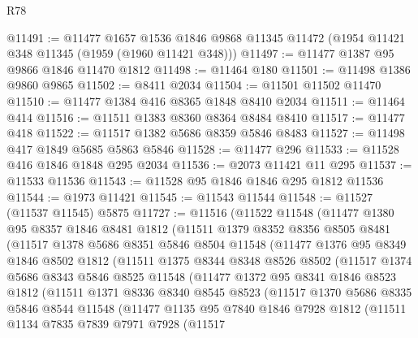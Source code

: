 \begin{lexlean}{R78}
\begin{coremodule}
@11491 := @11477
    @1657
    @1536
    @1846
    @9868
    @11345
    @11472
    (@1954 @11421 @348 @11345 (@1959 (@1960 @11421 @348)))
@11497 := @11477 @1387 @95 @9866 @1846 @11470 @1812
@11498 := @11464 @180
@11501 := @11498 @1386 @9860 @9865
@11502 := @8411 @2034
@11504 := @11501 @11502 @11470
@11510 := @11477 @1384 @416 @8365 @1848 @8410 @2034
@11511 := @11464 @414
@11516 := @11511 @1383 @8360 @8364 @8484 @8410
@11517 := @11477 @418
@11522 := @11517 @1382 @5686 @8359 @5846 @8483
@11527 := @11498 @417 @1849 @5685 @5863 @5846
@11528 := @11477 @296
@11533 := @11528 @416 @1846 @1848 @295 @2034
@11536 := @2073 @11421 @11 @295
@11537 := @11533 @11536
@11543 := @11528 @95 @1846 @1846 @295 @1812 @11536
@11544 := @1973 @11421
@11545 := @11543 @11544
@11548 := @11527 (@11537 @11545) @5875
@11727 := @11516
    (@11522
      @11548
      (@11477
        @1380
        @95
        @8357
        @1846
        @8481
        @1812
        (@11511
          @1379
          @8352
          @8356
          @8505
          @8481
          (@11517
            @1378
            @5686
            @8351
            @5846
            @8504
            @11548
            (@11477
              @1376
              @95
              @8349
              @1846
              @8502
              @1812
              (@11511
                @1375
                @8344
                @8348
                @8526
                @8502
                (@11517
                  @1374
                  @5686
                  @8343
                  @5846
                  @8525
                  @11548
                  (@11477
                    @1372
                    @95
                    @8341
                    @1846
                    @8523
                    @1812
                    (@11511
                      @1371
                      @8336
                      @8340
                      @8545
                      @8523
                      (@11517
                        @1370
                        @5686
                        @8335
                        @5846
                        @8544
                        @11548
                        (@11477
                          @1135
                          @95
                          @7840
                          @1846
                          @7928
                          @1812
                          (@11511
                            @1134
                            @7835
                            @7839
                            @7971
                            @7928
                            (@11517

\end{coremodule}
\end{lexlean}
